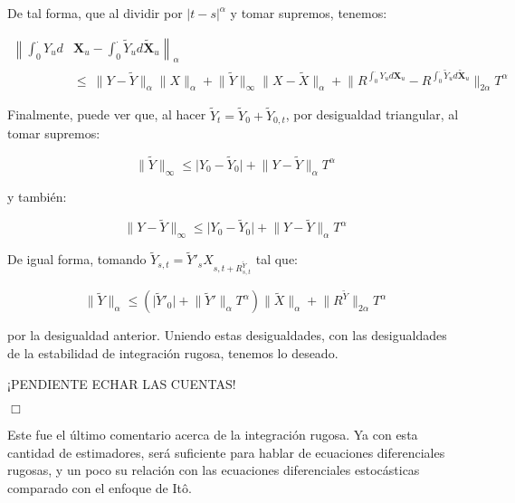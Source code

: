 De tal forma, que al dividir por $\lvert t - s \rvert^{\alpha}$ y tomar supremos, tenemos:

\begin{align*}
	\left\lVert \int_0^{\cdot} Y_u d \right. & \left. \mathbf{X}_u - \int_0^{\cdot} \tilde{Y}_u d \tilde{ \mathbf{X} }_u \right\rVert_{\alpha} \\
	&\leq \  \lVert Y - \tilde{Y} \rVert_{\alpha} \lVert X \rVert_{\alpha} + \lVert \tilde{Y} \rVert_{\infty} \lVert X - \tilde{X} \rVert_{\alpha} + \lVert  R^{\int_0^{\cdot} Y_u d \mathbf{X}_u } - R^{ \int_0^{\cdot} \tilde{Y}_u d \tilde{ \mathbf{X} }_u } \rVert_{2 \alpha} T^{\alpha}
\end{align*}

Finalmente, puede ver que, al hacer $\tilde{Y}_t = \tilde{Y}_0 + \tilde{Y}_{0,t}$, por desigualdad triangular, al tomar supremos:

\[
	\lVert \tilde{Y} \rVert_{\infty} \leq \lvert Y_0 - \tilde{Y}_0 \rvert + \lVert Y - \tilde{Y} \rVert_{\alpha} T^{\alpha}
\] 

y también:

\[
	\lVert Y - \tilde{Y} \rVert_{\infty} \leq \lvert Y_0 - \tilde{Y}_0  \rvert + \lVert Y - \tilde{Y} \rVert_{\alpha} T^{\alpha}
\]

De igual forma, tomando $\tilde{Y}_{s,t} = \tilde{Y}'_s X_{s,t + R^{\tilde{Y}}_{s,t} }$ tal que:

\[
	\lVert \tilde{Y} \rVert_{\alpha} \leq \left( \lvert \tilde{Y}'_0 \rvert + \lVert \tilde{Y}' \rVert_{\alpha} T^{\alpha} \right) \lVert \tilde{X} \rVert_{\alpha} + \lVert R^{\tilde{Y}} \rVert_{2 \alpha} T^{\alpha}
\]

por la desigualdad anterior. Uniendo estas desigualdades, con las desigualdades de la estabilidad de integración rugosa, tenemos lo deseado.

¡PENDIENTE ECHAR LAS CUENTAS!

\begin{flushright}
	$\Box$
\end{flushright}



Este fue el último comentario acerca de la integración rugosa. Ya con esta cantidad de estimadores, será suficiente para hablar de ecuaciones diferenciales rugosas, y un poco su relación con las ecuaciones diferenciales estocásticas comparado con el enfoque de Itô.
















